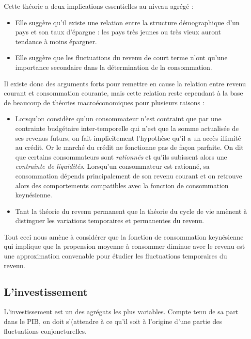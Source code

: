 \documentclass[10pt]{book}
\begin{document}
Cette théorie a deux implications essentielles au niveau agrégé : 
\begin{itemize}
  \item Elle suggère qu'il existe une relation entre la structure démographique d'un pays et son taux d'épargne : les pays très jeunes ou très vieux auront tendance à moins épargner.
  \item Elle suggère que les fluctuations du revenu de court terme n'ont qu'une importance secondaire dans la détermination de la consommation.
\end{itemize}
Il existe donc des arguments forts pour remettre en cause la relation entre revenu courant et consommation courante, mais cette relation reste cependant à la base de beaucoup de théories macroéconomiques pour plusieurs raisons : 
\begin{itemize}
  \item Lorsqu'on considère qu'un consommateur n'est contraint que par une contrainte budgétaire inter-temporelle qui n'est que la somme actualisée de ses revenus futurs, on fait implicitement l'hypothèse qu'il a un accès illimité au crédit. Or le marché du crédit ne fonctionne pas de façon parfaite. On dit que certains consommateurs sont \textit{rationnés} et qu'ils subissent alors une \textit{contrainte de liquidités}. Lorsqu'un consommateur est rationné, sa consommation dépends principalement de son revenu courant et on retrouve alors des comportements compatibles avec la fonction de consommation keynésienne.
  \item Tant la théorie du revenu permanent que la théorie du cycle de vie amènent à distinguer les variations temporaires et permanentes du revenu.
\end{itemize}
Tout ceci nous amène à considérer que la fonction de consommation keynésienne qui implique que la propension moyenne à consommer diminue avec le revenu est une approximation convenable pour étudier les fluctuations temporaires du revenu.
\subsection{L'investissement}
L'investissement est un des agrégats les plus variables. Compte tenu de sa part dans le PIB, on doit s'(attendre à ce qu'il soit à l'origine d'une partie des fluctuations conjoncturelles.
\end{document}
